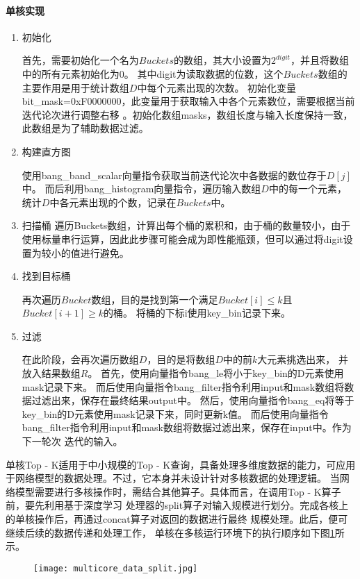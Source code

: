   \paragraph{单核实现}
\begin{enumerate}
\item {初始化}

  首先，需要初始化一个名为\(Buckets\)的数组，其大小设置为\(2^{digit}\)，并且将数组中的所有元素初始化为\(0\)。
  其中digit为读取数据的位数，这个\(Buckets\)数组的主要作用是用于统计数组\(D\)中每个元素出现的次数。
  初始化变量bit\_mask=0xF0000000，此变量用于获取输入中各个元素数位，需要根据当前迭代论次进行调整右移
  。初始化数组masks，数组长度与输入长度保持一致，此数组是为了辅助数据过滤。
  \item {构建直方图}

使用bang\_band\_scalar向量指令获取当前迭代论次中各数据的数位存于\(D[j]\)中。
而后利用bang\_histogram向量指令，遍历输入数组\(D\)中的每一个元素，统计\(D\)中各元素出现的个数，记录在\(Buckets\)中。
\item {扫描桶}
遍历Buckets数组，计算出每个桶的累积和，由于桶的数量较小，由于使用标量串行运算，因此此步骤可能会成为即性能瓶颈，但可以通过将digit设置为较小的值进行避免。

\item {找到目标桶}

再次遍历\(Bucket\)数组，目的是找到第一个满足\(Bucket[i] \le k\)且\(Bucket[i+1] \geq k\)的桶。
将桶的下标i使用key\_bin记录下来。

\item{过滤}

  在此阶段，会再次遍历数组\(D\)，目的是将数组\(D\)中的前\(k\)大元素挑选出来，
  并放入结果数组\(R\)。
  首先，使用向量指令bang\_le将小于key\_bin的D元素使用mask记录下来。
  而后使用向量指令bang\_filter指令利用input和mask数组将数据过滤出来，保存在最终结果output中。
  然后，使用向量指令bang\_eq将等于key\_bin的D元素使用mask记录下来，同时更新k值。
  而后使用向量指令bang\_filter指令利用input和mask数组将数据过滤出来，保存在input中。作为下一轮次
  迭代的输入。

\end{enumerate}

单核Top - K适用于中小规模的Top - K查询，具备处理多维度数据的能力，可应用于网络模型的数据处理。不过，它本身并未设计针对多核数据的处理逻辑。
当网络模型需要进行多核操作时，需结合其他算子。具体而言，在调用Top - K算子前，要先利用基于深度学习
处理器的split算子对输入规模进行划分。完成各核上的单核操作后，再通过concat算子对返回的数据进行最终
规模处理。此后，便可继续后续的数据传递和处理工作，
单核在多核运行环境下的执行顺序如下图\ref{fig:duohe_split}所示。
\begin{figure}[ht]
    \centering
    \texttt{[image: multicore\_data\_split.jpg]}
    \caption{}
    \label{fig:duohe_split}
\end{figure}

